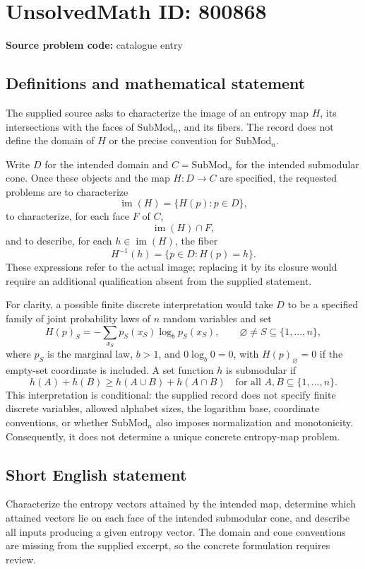 \documentclass[11pt]{article}
\begin{document}
\section*{UnsolvedMath ID: 800868}
\textbf{Source problem code:} catalogue entry
\subsection{Definitions and mathematical statement}
The supplied source asks to characterize the image of an entropy map \(H\), its intersections with the faces of \(\mathrm{SubMod}_n\), and its fibers. The record does not define the domain of \(H\) or the precise convention for \(\mathrm{SubMod}_n\).

Write \(D\) for the intended domain and \(C=\mathrm{SubMod}_n\) for the intended submodular cone. Once these objects and the map \(H:D\to C\) are specified, the requested problems are to characterize
\[
\operatorname{im}(H)=\{H(p):p\in D\},
\]
to characterize, for each face \(F\) of \(C\),
\[
\operatorname{im}(H)\cap F,
\]
and to describe, for each \(h\in\operatorname{im}(H)\), the fiber
\[
H^{-1}(h)=\{p\in D:H(p)=h\}.
\]
These expressions refer to the actual image; replacing it by its closure would require an additional qualification absent from the supplied statement.

For clarity, a possible finite discrete interpretation would take \(D\) to be a specified family of joint probability laws of \(n\) random variables and set
\[
H(p)_S=-\sum_{x_S}p_S(x_S)\log_b p_S(x_S),
\qquad \varnothing\ne S\subseteq\{1,\ldots,n\},
\]
where \(p_S\) is the marginal law, \(b>1\), and \(0\log_b0=0\), with \(H(p)_\varnothing=0\) if the empty-set coordinate is included. A set function \(h\) is submodular if
\[
h(A)+h(B)\ge h(A\cup B)+h(A\cap B)
\quad\text{for all }A,B\subseteq\{1,\ldots,n\}.
\]
This interpretation is conditional: the supplied record does not specify finite discrete variables, allowed alphabet sizes, the logarithm base, coordinate conventions, or whether \(\mathrm{SubMod}_n\) also imposes normalization and monotonicity. Consequently, it does not determine a unique concrete entropy-map problem.
\subsection{Short English statement}
Characterize the entropy vectors attained by the intended map, determine which attained vectors lie on each face of the intended submodular cone, and describe all inputs producing a given entropy vector. The domain and cone conventions are missing from the supplied excerpt, so the concrete formulation requires review.
\end{document}
